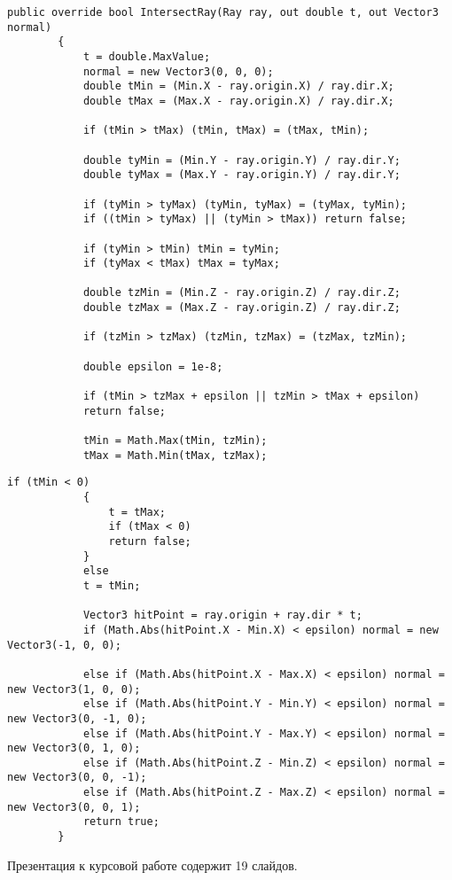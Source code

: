 \begin{center}
	\begin{lstlisting}[label={lst:CubeIntersection}, caption={Алгоритм поиска точки пересечения луча с кубом (начало)}]
		public override bool IntersectRay(Ray ray, out double t, out Vector3 normal)
		{
			t = double.MaxValue;
			normal = new Vector3(0, 0, 0);
			double tMin = (Min.X - ray.origin.X) / ray.dir.X;
			double tMax = (Max.X - ray.origin.X) / ray.dir.X;
			
			if (tMin > tMax) (tMin, tMax) = (tMax, tMin);
			
			double tyMin = (Min.Y - ray.origin.Y) / ray.dir.Y;
			double tyMax = (Max.Y - ray.origin.Y) / ray.dir.Y;
			
			if (tyMin > tyMax) (tyMin, tyMax) = (tyMax, tyMin);
			if ((tMin > tyMax) || (tyMin > tMax)) return false;
			
			if (tyMin > tMin) tMin = tyMin;
			if (tyMax < tMax) tMax = tyMax;
			
			double tzMin = (Min.Z - ray.origin.Z) / ray.dir.Z;
			double tzMax = (Max.Z - ray.origin.Z) / ray.dir.Z;
			
			if (tzMin > tzMax) (tzMin, tzMax) = (tzMax, tzMin);
			
			double epsilon = 1e-8;
			
			if (tMin > tzMax + epsilon || tzMin > tMax + epsilon)
			return false;
			
			tMin = Math.Max(tMin, tzMin);
			tMax = Math.Min(tMax, tzMax);
		\end{lstlisting}
	\end{center}	
	
	\setcounter{lstlisting}{0}
	\clearpage
	\begin{center}
		\begin{lstlisting}[label={lst:CubeIntersection}, caption={Алгоритм поиска точки пересечения луча с кубом (конец)}]
			if (tMin < 0)
			{
				t = tMax;
				if (tMax < 0) 
				return false;
			}
			else 
			t = tMin;
			
			Vector3 hitPoint = ray.origin + ray.dir * t;
			if (Math.Abs(hitPoint.X - Min.X) < epsilon) normal = new Vector3(-1, 0, 0);
			
			else if (Math.Abs(hitPoint.X - Max.X) < epsilon) normal = new Vector3(1, 0, 0);
			else if (Math.Abs(hitPoint.Y - Min.Y) < epsilon) normal = new Vector3(0, -1, 0);
			else if (Math.Abs(hitPoint.Y - Max.Y) < epsilon) normal = new Vector3(0, 1, 0);
			else if (Math.Abs(hitPoint.Z - Min.Z) < epsilon) normal = new Vector3(0, 0, -1);
			else if (Math.Abs(hitPoint.Z - Max.Z) < epsilon) normal = new Vector3(0, 0, 1);
			return true;
		}
	\end{lstlisting}
\end{center}

\clearpage

Презентация к курсовой работе содержит 19 слайдов.